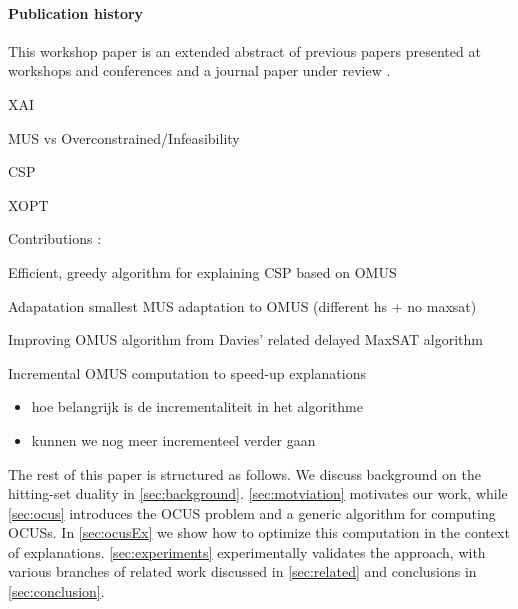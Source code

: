 {{\paragraph*{Publication history} This workshop paper is an extended abstract of previous papers presented at workshops and conferences \cite{claesuser,DBLP:conf/bnaic/ClaesBCGG19,ecai/BogaertsGCG20} and a journal paper under review \cite{bogaerts2020framework}.
}

\begin{compactenum}
    \item XAI
    \item MUS vs Overconstrained/Infeasibility
    \item CSP
    \item XOPT
\end{compactenum}

Contributions : 
\begin{compactenum}
    \item Efficient, greedy algorithm for explaining CSP based on OMUS 
    \item Adapatation smallest MUS adaptation to OMUS (different hs + no maxsat) 
    \item Improving OMUS algorithm from Davies' related delayed MaxSAT algorithm 
    \item Incremental OMUS computation to speed-up explanations
    \begin{itemize}
        \item hoe belangrijk is de incrementaliteit in het algorithme
        \item kunnen  we nog meer incrementeel verder gaan
    \end{itemize}
\end{compactenum}
}


The rest of this paper is structured as follows.
We discuss background on the hitting-set duality in \cref{sec:background}. \cref{sec:motviation} motivates our work, while \cref{sec:ocus} introduces the OCUS problem and a generic \hitsetbased algorithm for computing OCUSs. In \cref{sec:ocusEx} we show how to optimize this computation in the context of explanations. 
\cref{sec:experiments} experimentally validates the approach, %
with various branches of related work discussed in \cref{sec:related} and conclusions in \cref{sec:conclusion}.


